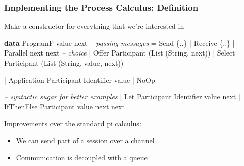 \documentclass[12pt]{beamer}
\newenvironment{Shaded}{}{}
\newcommand{\KeywordTok}[1]{\textcolor[rgb]{0.00,0.44,0.13}{\textbf{#1}}}
\newcommand{\DataTypeTok}[1]{\textcolor[rgb]{0.56,0.13,0.00}{#1}}
\newcommand{\CommentTok}[1]{\textcolor[rgb]{0.38,0.63,0.69}{\textit{#1}}}
\newcommand{\FunctionTok}[1]{\textcolor[rgb]{0.02,0.16,0.49}{#1}}
\newcommand{\NormalTok}[1]{#1}
\begin{document}
\begin{frame}[fragile]
\frametitle{Implementing the Process Calculus: Definition}

Make a constructor for everything that we're interested in

\begin{Shaded}
\begin{Highlighting}[]
\KeywordTok{data} \DataTypeTok{ProgramF}\NormalTok{ value next }
    \CommentTok{-- passing messages}
    \FunctionTok{=} \DataTypeTok{Send}\NormalTok{ \{..\}}
    \FunctionTok{|} \DataTypeTok{Receive}\NormalTok{ \{..\}}
    \FunctionTok{|} \DataTypeTok{Parallel}\NormalTok{ next next }
    \CommentTok{-- choice}
    \FunctionTok{|} \DataTypeTok{Offer} \DataTypeTok{Participant}\NormalTok{ (}\DataTypeTok{List}\NormalTok{ (}\DataTypeTok{String}\NormalTok{, next))}
    \FunctionTok{|} \DataTypeTok{Select} \DataTypeTok{Participant}\NormalTok{ (}\DataTypeTok{List}\NormalTok{ (}\DataTypeTok{String}\NormalTok{, value, next))}

    \FunctionTok{|} \DataTypeTok{Application} \DataTypeTok{Participant} \DataTypeTok{Identifier}\NormalTok{ value}
    \FunctionTok{|} \DataTypeTok{NoOp}


    \CommentTok{-- syntactic sugar for better examples}
    \FunctionTok{|} \DataTypeTok{Let} \DataTypeTok{Participant} \DataTypeTok{Identifier}\NormalTok{ value next }
    \FunctionTok{|} \DataTypeTok{IfThenElse} \DataTypeTok{Participant}\NormalTok{ value next next}
\end{Highlighting}
\end{Shaded}

Improvements over the standard pi calculus:
\begin{itemize}
    \item We can send part of a session over a channel
    \item Communication is decoupled with a queue
\end{itemize}


\end{frame}
\end{document}
